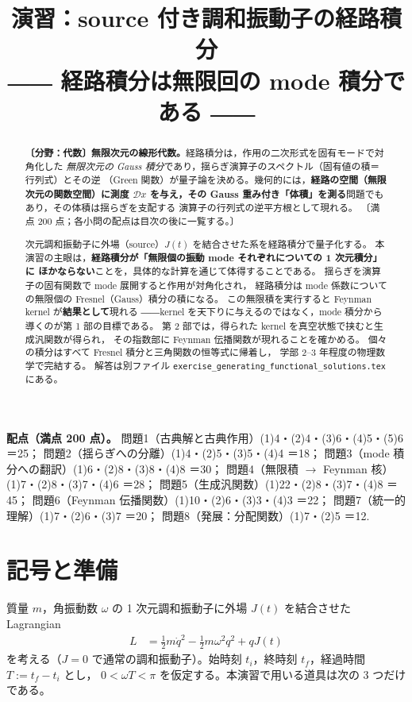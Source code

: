 \documentclass[dvipdfmx, uplatex]{jsarticle}
\title{演習：source 付き調和振動子の経路積分\\
\large ―― 経路積分は無限回の mode 積分である ――}
\author{}
\date{}
\theoremstyle{definition}
\begin{document}
\maketitle
\vspace{-6zh}

\begin{abstract}
\textbf{〔分野：代数〕無限次元の線形代数。}経路積分は，作用の二次形式を固有モードで対角化した
\emph{無限次元の Gauss 積分}であり，揺らぎ演算子のスペクトル（固有値の積＝行列式）とその逆
（Green 関数）が量子論を決める。幾何的には，\textbf{経路の空間（無限次元の関数空間）に測度
$\mathcal{D}x$ を与え，その Gauss 重み付き「体積」を測る}問題でもあり，その体積は揺らぎを支配する
演算子の行列式の逆平方根として現れる。
〔満点 200 点；各小問の配点は目次の後に一覧する。〕
\par{} 次元調和振動子に外場（source）$J(t)$ を結合させた系を経路積分で量子化する。
本演習の主眼は，\textbf{経路積分が「無限個の振動 mode それぞれについての 1 次元積分」に
ほかならない}ことを，具体的な計算を通じて体得することである。
揺らぎを演算子の固有関数で mode 展開すると作用が対角化され，
経路積分は mode 係数についての無限個の Fresnel（Gauss）積分の積になる。
この無限積を実行すると Feynman kernel が\textbf{結果として}現れる
――kernel を天下りに与えるのではなく，mode 積分から導くのが第 1 部の目標である。
第 2 部では，得られた kernel を真空状態で挟むと生成汎関数が得られ，
その指数部に Feynman 伝播関数が現れることを確かめる。
個々の積分はすべて Fresnel 積分と三角関数の恒等式に帰着し，
学部 2--3 年程度の物理数学で完結する。
解答は別ファイル \texttt{exercise\_generating\_functional\_solutions.tex} にある。
\end{abstract}

\tableofcontents

\medskip
{\small\sloppy
\noindent\textbf{配点（満点 200 点）。}
問題1（古典解と古典作用）(1)4・(2)4・(3)6・(4)5・(5)6 ＝25；\quad
問題2（揺らぎへの分離）(1)4・(2)5・(3)5・(4)4 ＝18；\quad
問題3（mode 積分への翻訳）(1)6・(2)8・(3)8・(4)8 ＝30；\quad
問題4（無限積 $\to$ Feynman 核）(1)7・(2)8・(3)7・(4)6 ＝28；\quad
問題5（生成汎関数）(1)22・(2)8・(3)7・(4)8 ＝45；\quad
問題6（Feynman 伝播関数）(1)10・(2)6・(3)3・(4)3 ＝22；\quad
問題7（統一的理解）(1)7・(2)6・(3)7 ＝20；\quad
問題8（発展：分配関数）(1)7・(2)5 ＝12.
\par}

\section*{記号と準備}
質量 $m$，角振動数 $\omega$ の 1 次元調和振動子に外場 $J(t)$ を結合させた Lagrangian
\begin{align}
    L
    &=
    \frac{1}{2}m\dot{q}^2
    -
    \frac{1}{2}m\omega^2q^2
    +
    qJ(t)
\label{eq:L}
\end{align}
を考える（$J=0$ で通常の調和振動子）。始時刻 $t_i$，終時刻 $t_f$，経過時間 $T:=t_f-t_i$ とし，
$0<\omega T<\pi$ を仮定する。本演習で用いる道具は次の 3 つだけである。
\end{document}
